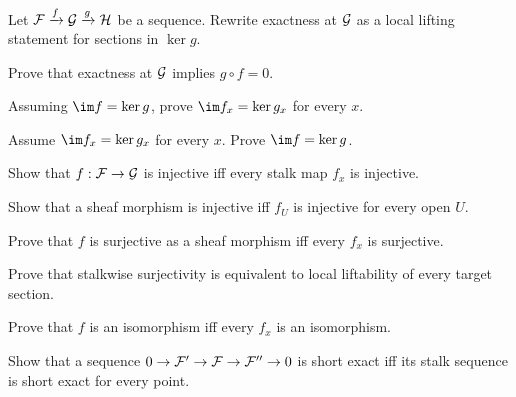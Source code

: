 \begin{exercise}\label{ex:vi16-01}
Let $\mathcal F\xrightarrow{f}\mathcal G\xrightarrow{g}\mathcal H$ be a sequence.  Rewrite exactness at $\mathcal G$ as a local lifting statement for sections in $\ker g$.
\end{exercise}

\begin{exercise}\label{ex:vi16-02}
Prove that exactness at $\mathcal G$ implies $g\circ f=0$.
\end{exercise}

\begin{exercise}\label{ex:vi16-03}
Assuming $\im f=\ker g$, prove $\im f_x=\ker g_x$ for every $x$.
\end{exercise}

\begin{exercise}\label{ex:vi16-04}
Assume $\im f_x=\ker g_x$ for every $x$.  Prove $\im f=\ker g$.
\end{exercise}

\begin{exercise}\label{ex:vi16-05}
Show that $f:\mathcal F\to\mathcal G$ is injective iff every stalk map $f_x$ is injective.
\end{exercise}

\begin{exercise}\label{ex:vi16-06}
Show that a sheaf morphism is injective iff $f_U$ is injective for every open $U$.
\end{exercise}

\begin{exercise}\label{ex:vi16-07}
Prove that $f$ is surjective as a sheaf morphism iff every $f_x$ is surjective.
\end{exercise}

\begin{exercise}\label{ex:vi16-08}
Prove that stalkwise surjectivity is equivalent to local liftability of every target section.
\end{exercise}

\begin{exercise}\label{ex:vi16-09}
Prove that $f$ is an isomorphism iff every $f_x$ is an isomorphism.
\end{exercise}

\begin{exercise}\label{ex:vi16-10}
Show that a sequence $0\to\mathcal F'\to\mathcal F\to\mathcal F''\to0$ is short exact iff its stalk sequence is short exact for every point.
\end{exercise}

